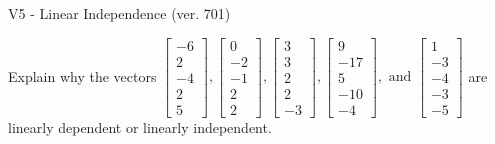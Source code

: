 \begin{exercise}
  \begin{exerciseTitle}V5 - Linear Independence (ver. 701)\end{exerciseTitle}
  \begin{exerciseStatement}
    Explain why the vectors \(\left[\begin{array}{r}
-6 \\
2 \\
-4 \\
2 \\
5
\end{array}\right] , \left[\begin{array}{r}
0 \\
-2 \\
-1 \\
2 \\
2
\end{array}\right] , \left[\begin{array}{r}
3 \\
3 \\
2 \\
2 \\
-3
\end{array}\right] , \left[\begin{array}{r}
9 \\
-17 \\
5 \\
-10 \\
-4
\end{array}\right] , \text{ and } \left[\begin{array}{r}
1 \\
-3 \\
-4 \\
-3 \\
-5
\end{array}\right]\) are linearly dependent or linearly independent.	



\end{exerciseStatement}
\end{exercise}
